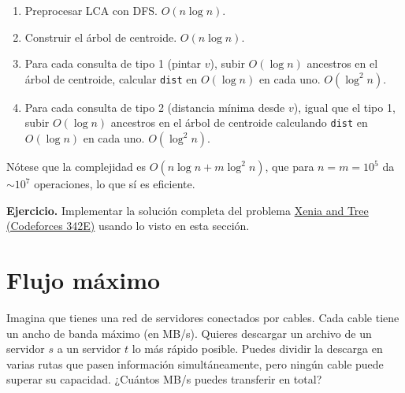 \begin{enumerate}
    \item Preprocesar LCA con DFS. $O(n \log n)$.
    \item Construir el árbol de centroide. $O(n \log n)$.
    \item Para cada consulta de tipo 1 (pintar $v$), subir $O(\log n)$ ancestros en el árbol de centroide, calcular \texttt{dist} en $O(\log n)$ en cada uno. $O(\log^2 n)$.
    \item Para cada consulta de tipo 2 (distancia mínima desde $v$), igual que el tipo 1, subir $O(\log n)$ ancestros en el árbol de centroide calculando \texttt{dist} en $O(\log n)$ en cada uno. $O(\log^2 n)$.
\end{enumerate}
 
Nótese que la complejidad es $O(n \log n + m \log^2 n)$, que para $n = m = 10^5$ da $\sim 10^7$ operaciones, lo que sí es eficiente.
 
\textbf{Ejercicio.} Implementar la solución completa del problema \href{https://codeforces.com/contest/342/problem/E}{Xenia and Tree (Codeforces 342E)} usando lo visto en esta sección.
 
\section{Flujo máximo\adv}
Imagina que tienes una red de servidores conectados por cables. Cada cable tiene un ancho de banda máximo (en MB/s). Quieres descargar un archivo de un servidor $s$ a un servidor $t$ lo más rápido posible. Puedes dividir la descarga en varias rutas que pasen información simultáneamente, pero ningún cable puede superar su capacidad. ¿Cuántos MB/s puedes transferir en total?
 
\begin{figure}[H]
\centering
{}
\end{figure}
 
